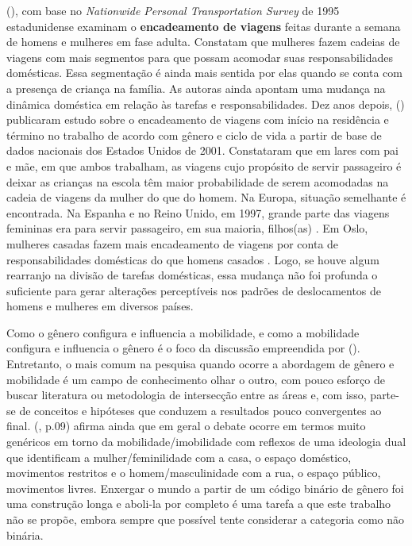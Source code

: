 

 (\citeyear{MCGUCKIN1995}), com base no  \emph{Nationwide Personal Transportation Survey} de 1995 estadunidense examinam o \textbf{encadeamento de viagens} feitas durante a semana de homens e mulheres em fase adulta. Constatam que mulheres fazem cadeias de viagens com mais segmentos para que possam acomodar suas responsabilidades domésticas. Essa segmentação é ainda mais sentida por elas quando se conta com a presença de criança na família. As autoras ainda apontam uma mudança na dinâmica doméstica em relação às tarefas e responsabilidades.
Dez anos depois,  (\citeyear{MCNUCKIN2005}) publicaram estudo sobre o encadeamento de viagens com início na residência e término no trabalho de acordo com gênero e ciclo de vida a partir de base de dados nacionais dos Estados Unidos de 2001. Constataram que em lares com pai e mãe, em que ambos trabalham, as viagens cujo propósito de servir passageiro é deixar as crianças na escola têm maior probabilidade de serem acomodadas na cadeia de viagens da mulher do que do homem.
Na Europa, situação semelhante é encontrada. Na Espanha e no Reino Unido, em 1997, grande parte das viagens femininas era para servir passageiro, em sua maioria, filhos(as) \cite{ROOT1999}. 
Em Oslo, mulheres casadas fazem mais encadeamento de viagens por conta de responsabilidades domésticas do que homens casados \cite{HJORTHOL2000}.
Logo, se houve algum rearranjo na divisão de tarefas domésticas, essa mudança não foi profunda o suficiente para gerar alterações perceptíveis nos padrões de deslocamentos de homens e mulheres em diversos países.


Como o gênero configura e influencia a mobilidade, e como a mobilidade configura e influencia o gênero é o foco da discussão empreendida por  (\citeyear{HANSON2010}). Entretanto, o mais comum na pesquisa quando ocorre a abordagem de gênero e mobilidade é um campo de conhecimento olhar o outro, com pouco esforço de buscar literatura ou metodologia de intersecção entre as áreas e, com isso, parte-se de conceitos e hipóteses que conduzem a resultados pouco convergentes ao final.  (\citeyear{HANSON2010}, p.09) afirma ainda que em geral o debate ocorre em termos muito genéricos em torno da mobilidade/imobilidade com reflexos de uma ideologia dual que identificam a mulher/feminilidade com a casa, o espaço doméstico, movimentos restritos e o homem/masculinidade com a rua, o espaço público, movimentos livres. Enxergar o mundo a partir de um código binário de gênero foi uma construção longa e aboli-la por completo é uma tarefa a que este trabalho não se propõe, embora sempre que possível tente considerar a categoria como não binária.

